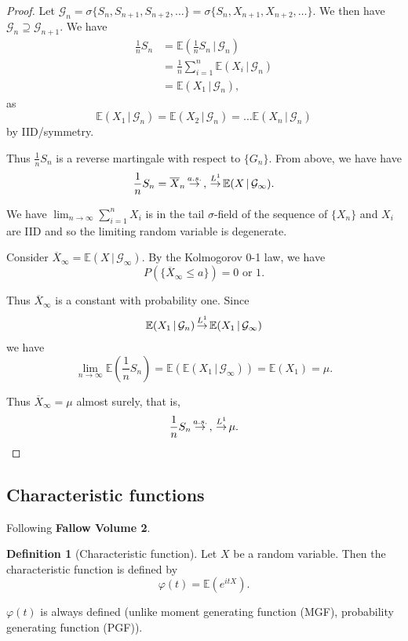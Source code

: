 \documentclass[10pt, oneside, reqno]{amsart}
\theoremstyle{plain}%
\theoremstyle{definition}
\newtheorem{defn}[thm]{Definition}
\theoremstyle{remark}
\newcommand{\given}{ \, | \,}
\renewcommand{\phi}{\varphi}
\newcommand{\E}{\mathbb{E}}
\def\cas{\,{\buildrel a.s. \over \rightarrow}\,}
\def\clone{\,{\buildrel L^1 \over \rightarrow}\,}
\newcommand{\sigg}{\mathcal{G}}
\newcommand{\sumni}{\sum_{i=1}^n}
\begin{document}
\begin{proof}
	Let $\sigg_n = \sigma \{ S_n , S_{n+1}, S_{n+2}, \dots \} = \sigma \{ S_n, X_{n+1}, X_{n+2}, \dots \}$.  We then have $\sigg_n \supseteq \sigg_{n+1}$. We have \begin{align*}
		\frac{1}{n} S_n &= \E(\frac{1}{n} S_n \given \sigg_n) \\
		 	&= \frac{1}{n} \sumni \E(X_i \given \sigg_n) \\
			&= \E(X_1 \given \sigg_n),
	\end{align*}  as \[
		\E(X_1 \given \sigg_n) = \E(X_2 \given \sigg_n) = \dots \E(X_n \given \sigg_n)
	\] by IID/symmetry.
	
	Thus $\frac{1}{n} S_n$ is a reverse martingale with respect to $\{ G_n \}$.  From above, we have have \[
		\frac{1}{n} S_n = \overline X_n \cas, \clone \E(X \given \sigg_\infty). 
	\]
	
	We have $\lim_{ n \rightarrow \infty} \sumni X_i$ is in the tail $\sigma$-field of the sequence of $\{ X_n \}$ and $X_i$ are IID and so the limiting random variable is degenerate.  
	
	Consider $\overline X_\infty = \E(X \given \sigg_\infty)$.  By the Kolmogorov 0-1 law, we have \[
		P(\{ \overline X_\infty \leq a \}) = \text{0 or 1}.   
	\]
	
	Thus $\overline X_\infty$ is a constant with probability one.  Since \begin{align*}
		\E(X_1 \given \sigg_n) \clone \E(X_1 \given \sigg_\infty)
	\end{align*}  we have \[
		\lim_{n \rightarrow \infty} \E(\frac{1}{n} S_n) = \E( \E(X_1 \given \sigg_\infty)) = \E(X_1) = \mu.
	\]
	
	Thus $\overline X_\infty = \mu$ almost surely, that is, \[
		\frac{1}{n} S_n \cas, \clone \mu.
	\]
\end{proof}

\subsection{Characteristic functions} %
\label{sub:characteristic_functions}

Following \textbf{Fallow Volume 2}.
\begin{defn}[Characteristic function]
	Let $X$ be a random variable. Then the characteristic function is defined by \[\phi(t) = \E(e^{itX}).\]  
	
	$\phi(t)$ is always defined (unlike moment generating function (MGF), probability generating function (PGF)). 

\end{defn}
\end{document}

